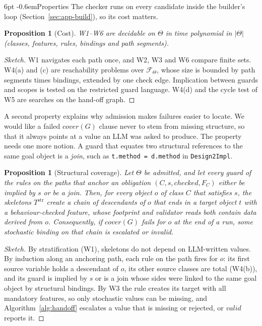 \documentclass[pdflatex,sn-mathphys-num]{sn-jnl}
\makeatletter
\theoremstyle{thmstyleone}%
\newtheorem{proposition}[theorem]{Proposition}%
\theoremstyle{thmstyletwo}%
\theoremstyle{thmstylethree}%
\newcommand{\Team}{\Theta}
\newcommand{\W}[1]{\textsf{W#1}}
\newcommand{\code}[1]{\texttt{#1}}
\renewcommand\paragraph{\@startsection{paragraph}{4}{\z@}%
  {6pt \@plus 2pt \@minus 1pt}{-0.6em}{\normalfont\normalsize\bfseries}}
\makeatother
\begin{document}
\paragraph{Properties} The checker runs on every candidate inside the builder's
loop (Section~\ref{sec:app-build}), so its cost matters.

\begin{proposition}[Cost]\label{prop:cost}
\W{1}--\W{6} are decidable on $\Team$ in time polynomial in $|\Team|$
(classes, features, rules, bindings and path segments).
\end{proposition}
\begin{proof}[Sketch]
\W{1} navigates each path once, and \W{2}, \W{3} and \W{6} compare finite
sets. \W{4}(a) and (c) are reachability problems over $\mathcal{F}_\Team$,
whose size is bounded by path segments times bindings, extended by one check
edge. Implication between guards and scopes is tested on the restricted guard
language. \W{4}(d) and the cycle test of \W{5} are searches on the hand-off
graph.
\end{proof}

A second property explains why admission makes failures easier to locate. We
would like a failed $\mathit{cover}(G)$ clause never to stem from missing
structure, so that it always points at a value an LLM was asked to produce.
The property needs one more notion. A guard that equates two structural
references to the same goal object is a \emph{join}, such as
\code{t.method = d.method} in \code{Design2Impl}.

\begin{proposition}[Structural coverage]\label{prop:struct}
Let $\Team$ be admitted, and let every guard of the rules on the paths that
anchor an obligation $(C,s,\mathit{checked},F_C)$ either be implied by $s$ or
be a join. Then, for every object $o$ of class $C$ that satisfies $s$, the
skeletons $T^{\mathrm{str}}$ create a chain of descendants of $o$ that ends in
a target object $t$ with a behaviour-checked feature, whose footprint and validator
reads both contain data derived from $o$. Consequently, if
$\mathit{cover}(G)$ fails for $o$ at the end of a run, some stochastic binding
on that chain is escalated or invalid.
\end{proposition}
\begin{proof}[Sketch]
By stratification (\W{1}), skeletons do not depend on LLM-written values. By
induction along an anchoring path, each rule on the path fires for $o$: its
first source variable holds a descendant of $o$, its other source classes are
total (\W{4}(b)), and its guard is implied by $s$ or is a join whose sides were
linked to the same goal object by structural bindings. By \W{3} the rule
creates its target with all mandatory features, so only stochastic values can
be missing, and Algorithm~\ref{alg:handoff} escalates a value that is missing
or rejected, or $\mathit{valid}$ reports it.
\end{proof}
\end{document}
